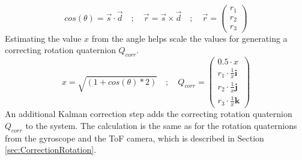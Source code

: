 \begin{equation*}
    cos(\theta) = \vec{s}\cdot\vec{d} \quad ; \quad \vec{r} = \vec{s}\times\vec{d} \quad ; \quad
    \vec{r} =
    \begin{pmatrix}
        r_{1} \\
        r_{2} \\
        r_{3}
    \end{pmatrix} 
\end{equation*}
Estimating the value $x$ from the angle helps scale the values for generating a correcting rotation quaternion $Q_{corr}$.
\begin{equation*}
    x=\sqrt{(1+cos(\theta)*2)} \quad ; \quad Q_{corr} =
    \begin{pmatrix}
        0.5\cdot x           \\
        r_{1}\cdot\frac{1}{x}\textbf{i} \\
        r_{2}\cdot\frac{1}{x}\textbf{j} \\
        r_{3}\cdot\frac{1}{x}\textbf{k}
    \end{pmatrix}    
\end{equation*}
An additional Kalman correction step adds the correcting rotation quaternion $Q_{corr}$ to the system. The calculation is the same as for the rotation quaternions from the gyroscope and the ToF camera, which is described in Section \ref{sec:CorrectionRotation}.
